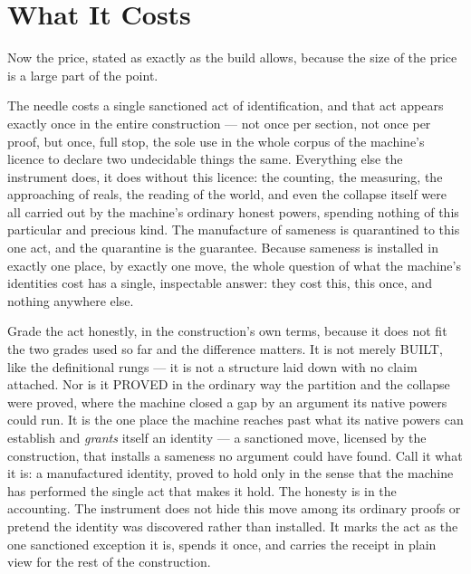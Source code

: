 \section{What It Costs}

Now the price, stated as exactly as the build allows, because the size of the price is a large part of the point.

The needle costs a single sanctioned act of identification, and that act appears exactly once in the entire
construction --- not once per section, not once per proof, but once, full stop, the sole use in the whole corpus
of the machine's licence to declare two undecidable things the same. Everything else the instrument does, it does
without this licence: the counting, the measuring, the approaching of reals, the reading of the world, and even
the collapse itself were all carried out by the machine's ordinary honest powers, spending nothing of this
particular and precious kind. The manufacture of sameness is quarantined to this one act, and the quarantine is
the guarantee. Because sameness is installed in exactly one place, by exactly one move, the whole question of what
the machine's identities cost has a single, inspectable answer: they cost this, this once, and nothing anywhere
else.

Grade the act honestly, in the construction's own terms, because it does not fit the two grades used so far and
the difference matters. It is not merely BUILT, like the definitional rungs --- it is not a structure laid down
with no claim attached. Nor is it PROVED in the ordinary way the partition and the collapse were proved, where the
machine closed a gap by an argument its native powers could run. It is the one place the machine reaches past what
its native powers can establish and \emph{grants} itself an identity --- a sanctioned move, licensed by the
construction, that installs a sameness no argument could have found. Call it what it is: a manufactured identity,
proved to hold only in the sense that the machine has performed the single act that makes it hold. The honesty is
in the accounting. The instrument does not hide this move among its ordinary proofs or pretend the identity was
discovered rather than installed. It marks the act as the one sanctioned exception it is, spends it once, and
carries the receipt in plain view for the rest of the construction.

